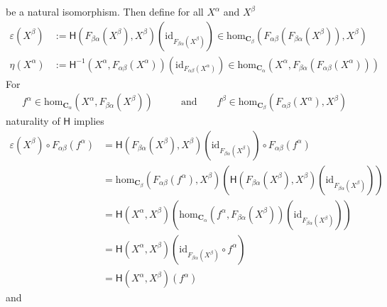 \begin{prf}
be a natural isomorphism.
Then define for all $X^{\alpha}$ and $X^{\beta}$
\begin{align*}
  \varepsilon(X^{\beta})
  &:=
  \mathsf{H}
  \left(
    F_{\beta\alpha}(X^{\beta}),
    X^{\beta}
  \right)
  \left(
    \mathrm{id}_{F_{\beta\alpha}(X^{\beta})}
  \right)
  \in
  \mathrm{hom}_{\mathbf{C}_{\beta}}
  \left(
    F_{\alpha\beta}
    \left(
      F_{\beta\alpha}(X^{\beta})
    \right),
    X^{\beta}
  \right)
  \\
  \eta(X^{\alpha})
  &:=
  \mathsf{H}^{-1}
  \left(
    X^{\alpha},
    F_{\alpha\beta}(X^{\alpha})
  \right)
  \left(
    \mathrm{id}_{F_{\alpha\beta}(X^{\alpha})}
  \right)
  \in
  \mathrm{hom}_{\mathbf{C}_{\alpha}}
  \left(
    X^{\alpha},
    F_{\beta\alpha}
    \left(
      F_{\alpha\beta}(X^{\alpha})
    \right)
  \right)
\end{align*}
For
\begin{align*}
  f^{\alpha}
  \in
  \mathrm{hom}_{\mathbf{C}_{\alpha}}
  \left(
    X^{\alpha},
    F_{\beta\alpha}(X^{\beta})
  \right)
  \qquad
  &\text{and}
  \qquad
  f^{\beta}
  \in
  \mathrm{hom}_{\mathbf{C}_{\beta}}
  \left(
    F_{\alpha\beta}(X^{\alpha}),
    X^{\beta}
  \right)
\end{align*}
naturality of $\mathsf{H}$ implies
\begin{align*}
  \varepsilon(X^{\beta})
  \circ
  F_{\alpha\beta}(f^{\alpha})
  &=
  \mathsf{H}
  \left(
    F_{\beta\alpha}(X^{\beta}),
    X^{\beta}
  \right)
  \left(
    \mathrm{id}_{F_{\beta\alpha}(X^{\beta})}
  \right)
  \circ
  F_{\alpha\beta}(f^{\alpha})
  \\
  &=
  \mathrm{hom}_{\mathbf{C}_{\beta}}
  \left(
    F_{\alpha\beta}(f^{\alpha}),
    X^{\beta}
  \right)
  \left(
    \mathsf{H}
    \left(
      F_{\beta\alpha}(X^{\beta}),
      X^{\beta}
    \right)
    \left(
      \mathrm{id}_{F_{\beta\alpha}(X^{\beta})}
    \right)
  \right)
  \\
  &=
  \mathsf{H}(X^{\alpha},X^{\beta})
  \left(
    \mathrm{hom}_{\mathbf{C}_{\alpha}}
    \left(
      f^{\alpha},
      F_{\beta\alpha}(X^{\beta})
    \right)
    \left(
      \mathrm{id}_{F_{\beta\alpha}(X^{\beta})}
    \right)
  \right)
  \tag{NT}
  \\
  &=
  \mathsf{H}(X^{\alpha},X^{\beta})
  \left(
    \mathrm{id}_{F_{\beta\alpha}(X^{\beta})}
    \circ
    f^{\alpha}
  \right)
  \\
  &=
  \mathsf{H}(X^{\alpha},X^{\beta})(f^{\alpha})
\end{align*}
and
\begin{align*}

\end{align*}
\end{prf}
